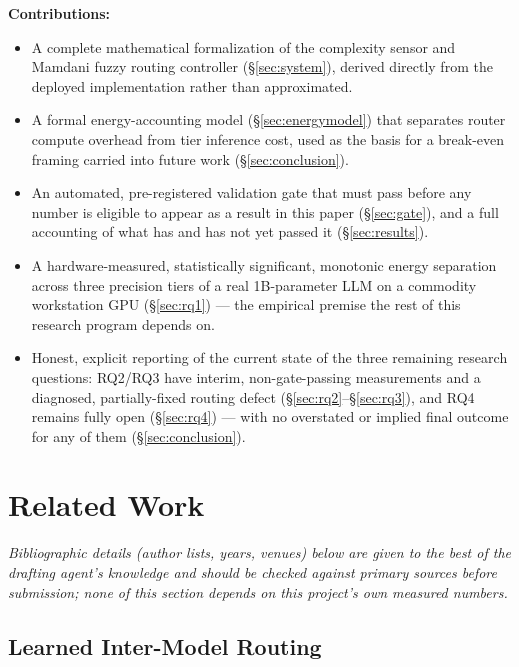 \documentclass[conference]{IEEEtran}
\begin{document}
\textbf{Contributions:}
\begin{itemize}
  \item A complete mathematical formalization of the complexity sensor
    and Mamdani fuzzy routing controller (\S\ref{sec:system}), derived
    directly from the deployed implementation rather than approximated.
  \item A formal energy-accounting model (\S\ref{sec:energymodel}) that
    separates router compute overhead from tier inference cost, used as
    the basis for a break-even framing carried into future work
    (\S\ref{sec:conclusion}).
  \item An automated, pre-registered validation gate that must pass
    before any number is eligible to appear as a result in this paper
    (\S\ref{sec:gate}), and a full accounting of what has and has not yet
    passed it (\S\ref{sec:results}).
  \item A hardware-measured, statistically significant, monotonic energy
    separation across three precision tiers of a real 1B-parameter LLM on
    a commodity workstation GPU (\S\ref{sec:rq1}) --- the empirical
    premise the rest of this research program depends on.
  \item Honest, explicit reporting of the current state of the three
    remaining research questions: RQ2/RQ3 have interim, non-gate-passing
    measurements and a diagnosed, partially-fixed routing defect
    (\S\ref{sec:rq2}--\S\ref{sec:rq3}), and RQ4 remains fully open
    (\S\ref{sec:rq4}) --- with no overstated or implied final outcome for
    any of them (\S\ref{sec:conclusion}).
\end{itemize}

\section{Related Work}
\label{sec:related}

\textit{Bibliographic details (author lists, years, venues) below are
given to the best of the drafting agent's knowledge and should be checked
against primary sources before submission; none of this section depends
on this project's own measured numbers.}

\subsection{Learned Inter-Model Routing}
\end{document}
